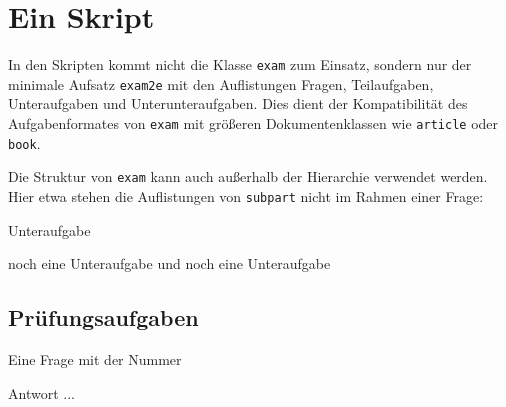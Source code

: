 \documentclass[a4paper,12pt]{article}
\begin{document}
\section{Ein Skript}
In den Skripten kommt nicht die Klasse \texttt{exam} zum Einsatz, sondern nur der minimale Aufsatz \texttt{exam2e} mit den Auflistungen Fragen, Teilaufgaben, Unteraufgaben und Unterunteraufgaben. Dies dient der Kompatibilität des Aufgabenformates von \texttt{exam} mit größeren Dokumentenklassen wie \texttt{article} oder \texttt{book}.

Die Struktur von \texttt{exam} kann auch außerhalb der Hierarchie verwendet werden. Hier etwa stehen die Auflistungen von \texttt{subpart} nicht im Rahmen einer Frage:
\begin{subparts}
	\subpart Unteraufgabe

	\subpart noch eine Unteraufgabe
	\subpart und noch eine Unteraufgabe
\end{subparts}

\subsection{Prüfungsaufgaben}
\question%
	Eine Frage mit der Nummer \thequestion
{}
%
\begin{solution}
	Antwort ...
\end{solution}
\end{document}
